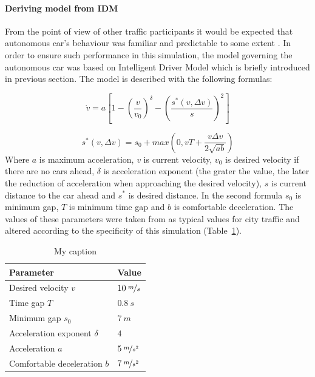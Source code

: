 \documentclass[11pt,english,twoside]{article}
\begin{document}
\paragraph{Deriving model from IDM}%
From the point of view of other traffic participants it would be expected that autonomous car's behaviour was familiar and predictable to some extent \citep{sivak2015road}. In order to ensure such performance in this simulation, the model governing the autonomous car was based on Intelligent Driver Model which is briefly introduced in previous section. The model is described with the following formulas:



\begin{equation}
\dot{v}=a\left[1-\left(\frac{v}{v_0}\right)^{\delta}-\left(\frac{s^{*}\left ( v,\Delta v \right )}{s}\right)^{2}\right]
\end{equation}

\begin{equation}
s^{*}\left ( v,\Delta v \right )=s_0+max\left ( 0,vT+\frac{v\Delta v}{2 \sqrt{ab}} \right )
\end{equation}
Where $a$ is maximum acceleration, $v$ is current velocity, $v_0$ is desired velocity if there are no cars ahead, $\delta$ is acceleration exponent (the grater the value, the later the reduction of acceleration when approaching  the desired velocity), $s$ is current distance to the car ahead and  $s^{*}$ is desired distance.
In the second formula $s_0$ is minimum gap, $T$ is minimum time gap and $b$ is comfortable deceleration. The values of these parameters were taken from \citet{sivak2015road} as typical values for city traffic and altered according to the specificity of this simulation (Table~\ref{table:idm}).


\begin{table}[!]
\centering
\begin{tabular}{|p{7cm}|p{3cm}|}
\hline
\textbf{Parameter}          & \textbf{Value} \\ \hline
Desired velocity $v$          & $10\:\nicefrac{m}{s}$         \\ \hline
Time gap $T$                  & $0.8\:s$          \\ \hline
Minimum gap $s_0$            & $7\:m$            \\ \hline
Acceleration exponent $\delta$ & $4$              \\ \hline
Acceleration $a$              & $5\:\nicefrac{m}{s^2}$         \\ \hline
Comfortable deceleration $b$  & $7\:\nicefrac{m}{s^2}$         \\ \hline
\end{tabular}
\caption{My caption}
\label{table:idm}
\end{table}
\end{document}
